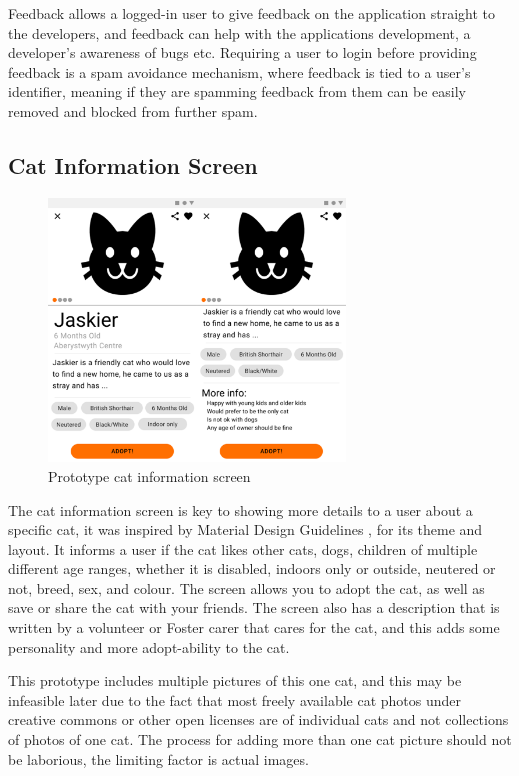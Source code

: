 Feedback allows a logged-in user to give feedback on the application straight to the developers, and feedback can help with the applications development, a developer's awareness of bugs etc. Requiring a user to login before providing feedback is a spam avoidance mechanism, where feedback is tied to a user's identifier, meaning if they are spamming feedback from them can be easily removed and blocked from further spam.

\subsection{Cat Information Screen} \label{PROTOTYPECATINFORMATIONSCREEN}

\begin{figure} [htbp!]
    \centering
    \includegraphics[height=7cm]{Images/PrototypeCatInfo.png}
    \caption{Prototype cat information screen}
    \label{fig:prototype_cat_info_screen}
\end{figure}

The cat information screen is key to showing more details to a user about a specific cat, it was inspired by Material Design Guidelines \cite{MATERIALDESIGNGUIDELINES}, for its theme and layout. It informs a user if the cat likes other cats, dogs, children of multiple different age ranges, whether it is disabled, indoors only or outside, neutered or not, breed, sex, and colour. The screen allows you to adopt the cat, as well as save or share the cat with your friends. The screen also has a description that is written by a volunteer or Foster carer that cares for the cat, and this adds some personality and more adopt-ability to the cat. 

This prototype includes multiple pictures of this one cat, and this may be infeasible later due to the fact that most freely available cat photos under creative commons or other open licenses are of individual cats and not collections of photos of one cat. The process for adding more than one cat picture should not be laborious, the limiting factor is actual images.


